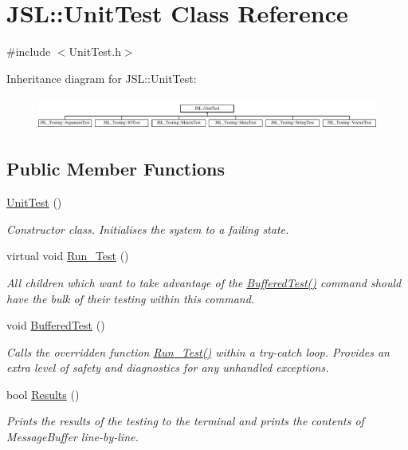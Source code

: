 \hypertarget{classJSL_1_1UnitTest}{}\section{J\+SL\+:\+:Unit\+Test Class Reference}
\label{classJSL_1_1UnitTest}


{\ttfamily \#include $<$Unit\+Test.\+h$>$}

Inheritance diagram for J\+SL\+:\+:Unit\+Test\+:\begin{figure}[H]
\begin{center}
\leavevmode
\includegraphics[height=1.085271cm]{classJSL_1_1UnitTest}
\end{center}
\end{figure}
\subsection*{Public Member Functions}
\begin{DoxyCompactItemize}
\item 
\hyperlink{classJSL_1_1UnitTest_aa3bc8d5c99696d5bc6e63b8da358a0ed}{Unit\+Test} ()
\begin{DoxyCompactList}\small\item\em Constructor class. Initialises the system to a failing state. \end{DoxyCompactList}\item 
virtual void \hyperlink{classJSL_1_1UnitTest_aa8369ab1ce2a537bff2ea7e1c8818490}{Run\+\_\+\+Test} ()
\begin{DoxyCompactList}\small\item\em All children which want to take advantage of the \hyperlink{classJSL_1_1UnitTest_aabec19b081be8a428f12e4b5e3dc2a9c}{Buffered\+Test()} command should have the bulk of their testing within this command. \end{DoxyCompactList}\item 
void \hyperlink{classJSL_1_1UnitTest_aabec19b081be8a428f12e4b5e3dc2a9c}{Buffered\+Test} ()
\begin{DoxyCompactList}\small\item\em Calls the overridden function \hyperlink{classJSL_1_1UnitTest_aa8369ab1ce2a537bff2ea7e1c8818490}{Run\+\_\+\+Test()} within a try-\/catch loop. Provides an extra level of safety and diagnostics for any unhandled exceptions. \end{DoxyCompactList}\item 
bool \hyperlink{classJSL_1_1UnitTest_a39e1076dd985334ce21606ae2a383f70}{Results} ()
\begin{DoxyCompactList}\small\item\em Prints the results of the testing to the terminal and prints the contents of Message\+Buffer line-\/by-\/line. \end{DoxyCompactList}\end{DoxyCompactItemize}
